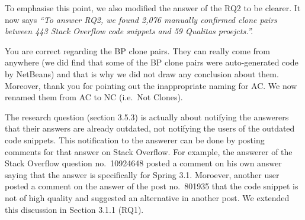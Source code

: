 \documentclass[a4paper,twoside,10pt]{reviewresponse}
\begin{document}
To emphasise this point, we also modified the answer of the RQ2 to be clearer. It now says \textit{``To answer RQ2, we found 2,076 manually confirmed clone pairs between 443 Stack Overflow code snippets
and 59 Qualitas proejcts.''.}


You are correct regarding the BP clone pairs. They can really come from anywhere (we did find that some of the BP clone pairs were auto-generated code by NetBeans) and that is why we did not draw any conclusion about them. 
Moreover, thank you for pointing out the inappropriate naming for AC. We now renamed them from AC to NC (i.e.~Not Clones).


The research question (section 3.5.3) is actually about notifying the answerers that their answers are already outdated, not notifying the users of the outdated code snippets. This notification to the answerer can be done by posting comments for that answer on Stack Overflow. For example, the answerer of the Stack Overflow question no.~10924648 posted a comment on his own answer saying that the answer is specifically for Spring 3.1. Moroever, another user posted a comment on the answer of the post no.~801935 that the code snippet is not of high quality and suggested an alternative in another post. We extended this discussion in Section 3.1.1 (RQ1). 

\end{document}
